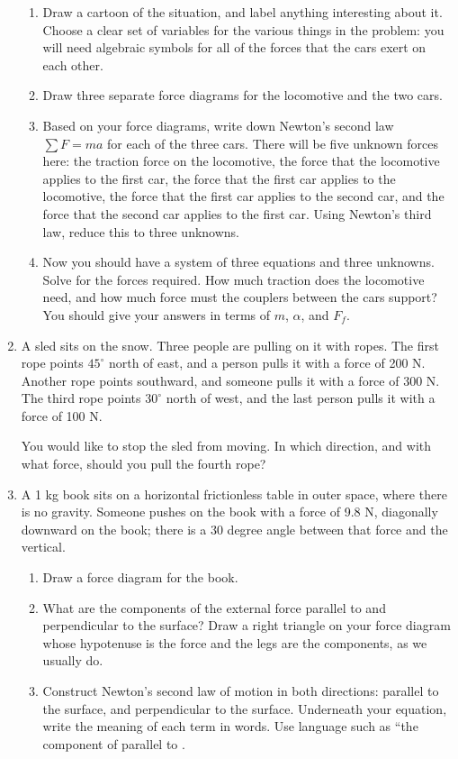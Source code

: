 \documentclass[12pt]{article}
\begin{document}
\begin{enumerate}
\begin{enumerate}
\item Draw a cartoon of the situation, and label anything interesting about it. Choose a clear set of variables for the various things in the problem: you will need algebraic symbols for all of the forces that the cars exert on each other.
\item Draw three separate force diagrams for the locomotive and the two cars.
\item Based on your force diagrams, write down Newton's second law $\sum F = ma$ for each of the three cars. There will be five unknown forces here: the traction force on the locomotive, the force that the locomotive applies to the first car,
the force that the first car applies to the locomotive, the force that the first car applies to the second car, and the force that the second car applies to the first car. Using Newton's third law, reduce this to three unknowns.
\item Now you should have a system of three equations and three unknowns. Solve for the forces required. How much 
traction does the locomotive need, and how much force must the couplers between the cars support? You should give your answers in terms of $m$, $\alpha$, and $F_f$.
\end{enumerate} 


\item A sled sits on the snow. Three people are pulling on it with ropes. The first rope points $45^\circ$ north of east, and a person pulls it with a force of 200 N.
Another rope points southward, and someone pulls it with a force of 300 N. The third rope points $30^\circ$ north of west, and the last person pulls it with a force of
100 N.

You would like to stop the sled from moving. In which direction, and with what force, should you pull the fourth rope?


\item{A 1 kg book sits on a horizontal frictionless table in outer space, where there is no
 	gravity. Someone pushes on the book with a force of 9.8 N, diagonally downward on the book; there is a 30 degree
 	angle between that force and the vertical.}

 	\begin{enumerate}
\item{Draw a force diagram for the book. }
\item{What are the components of the external force parallel to and perpendicular to
 	the surface? Draw a right triangle on your force diagram whose hypotenuse is the
 	force and the legs are the components, as we usually do.}
\item Construct Newton's second law of motion in both directions: parallel to the surface, and perpendicular to the surface. 
Underneath your equation, write the meaning of each term in words. Use language such as ``the component of \underline{\hspace{0.5in}} parallel to \underline{\hspace{0.5in}}.



\end{enumerate}
\end{enumerate}
\end{document}
